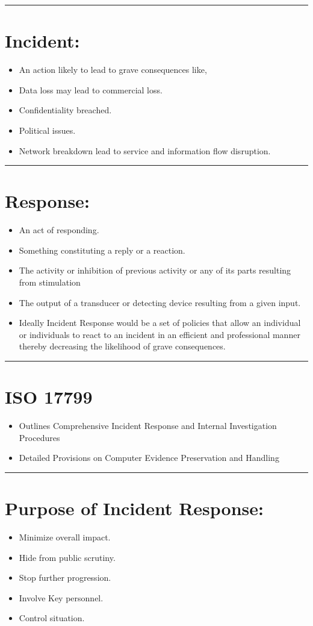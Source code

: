 \documentclass[british]{article}
\begin{document}
\rule[0.5ex]{0.75\columnwidth}{1pt}

\section{Incident:}
\begin{itemize}
	\item An action likely to lead to grave consequences like,
	\item Data loss may lead to commercial loss.
	\item Confidentiality breached.
	\item Political issues.
	\item Network breakdown lead to service and information flow disruption.
\end{itemize}
\rule[0.5ex]{0.75\columnwidth}{1pt}

\section{Response:}
\begin{itemize}
	\item An act of responding.
	\item Something constituting a reply or a reaction.
	\item The activity or inhibition of previous activity or any of its parts
	      resulting from stimulation
	\item The output of a transducer or detecting device resulting from a given
	      input.
	\item Ideally Incident Response would be a set of policies that allow an
	      individual or individuals to react to an incident in an efficient
	      and professional manner thereby decreasing the likelihood of grave
	      consequences.
\end{itemize}
\rule[0.5ex]{0.75\columnwidth}{1pt}

\section{ISO 17799}
\begin{itemize}
	\item Outlines Comprehensive Incident Response and Internal Investigation
	      Procedures
	\item Detailed Provisions on Computer Evidence Preservation and Handling
\end{itemize}
\rule[0.5ex]{0.75\columnwidth}{1pt}

\section{Purpose of Incident Response:}
\begin{itemize}
	\item Minimize overall impact.
	\item Hide from public scrutiny.
	\item Stop further progression.
	\item Involve Key personnel.
	\item Control situation.
\end{itemize}
\end{document}

